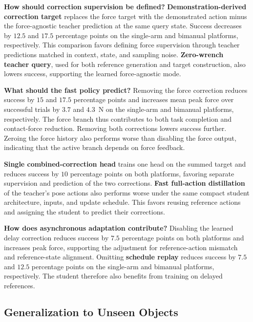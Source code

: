 \begin{samepage}
\noindent\textbf{How should correction supervision be defined?}
\textbf{Demonstration-derived correction target} replaces the force target with the demonstrated action minus the force-agnostic teacher prediction at the same query state. Success decreases by $12.5$ and $17.5$ percentage points on the single-arm and bimanual platforms, respectively. This comparison favors defining force supervision through teacher predictions matched in context, state, and sampling noise. \textbf{Zero-wrench teacher query}, used for both reference generation and target construction, also lowers success, supporting the learned force-agnostic mode.

\end{samepage}

\noindent\textbf{What should the fast policy predict?}
Removing the force correction reduces success by $15$ and $17.5$ percentage points and increases mean peak force over successful trials by $3.7$ and $4.3$~N on the single-arm and bimanual platforms, respectively. The force branch thus contributes to both task completion and contact-force reduction. Removing both corrections lowers success further. Zeroing the force history also performs worse than disabling the force output, indicating that the active branch depends on force feedback.

\textbf{Single combined-correction head} trains one head on the summed target and reduces success by $10$ percentage points on both platforms, favoring separate supervision and prediction of the two corrections. \textbf{Fast full-action distillation} of the teacher's pose actions also performs worse under the same compact student architecture, inputs, and update schedule. This favors reusing reference actions and assigning the student to predict their corrections.

\noindent\textbf{How does asynchronous adaptation contribute?}
Disabling the learned delay correction reduces success by $7.5$ percentage points on both platforms and increases peak force, supporting the adjustment for reference-action mismatch and reference-state alignment. Omitting \textbf{schedule replay} reduces success by $7.5$ and $12.5$ percentage points on the single-arm and bimanual platforms, respectively. The student therefore also benefits from training on delayed references.

\subsection{Generalization to Unseen Objects}
\label{sec:exp_physical_generalization}

